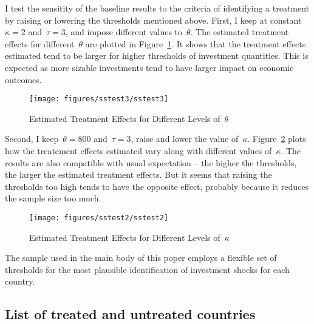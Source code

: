 \documentclass[10pt,a4paper]{article}
\begin{document}
{\label{224476}}

I test the sensitity of the baseline results to the criteria of
identifying a treatment by raising or lowering the thresholds mentioned
above. First, I keep at constant~\(\kappa=2\)
and~\(\tau=3\), and impose different values
to~\(\theta\). The estimated treatment effects for
different~\(\theta\) are plotted in
Figure~{\ref{813720}}. It shows that the treatment
effects estimated tend to be larger for higher thresholds of investment
quantities. This is expected as more sizable investments tend to have
larger impact on economic outcomes.~
\begin{figure}[H]
\begin{center}
\texttt{[image: figures/sstest3/sstest3]}
\caption{{Estimated Treatment Effects for Different Levels of~\(\theta\)
{\label{813720}}%
}}
\end{center}
\end{figure}

Second, I keep~\(\theta=800\) and~\(\tau=3\), raise and
lower the value of~\(\kappa\).
Figure~{\ref{688913}} plots how the treatement effects
estimated vary along with different values of~\(\kappa\). The
results are also compatible with usual expectation -- the higher the
thresholds, the larger the estimated treatment effects. But it seems
that raising the thresholds too high tends to have the opposite effect,
probably because it reduces the sample size too much.~
\begin{figure}[H]
\begin{center}
\texttt{[image: figures/sstest2/sstest2]}
\caption{{Estimated Treatment Effects for Different Levels of~\(\kappa\)
{\label{688913}}%
}}
\end{center}
\end{figure}

The sample used in the main body of this poper employs a flexible set of
thresholds for the most plausible identification of investment shocks
for each country.~

\subsection{List of treated and untreated
countries}
\end{document}
